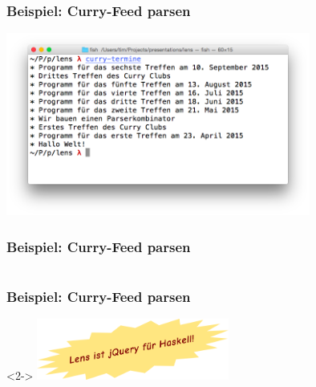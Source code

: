 \documentclass{beamer}
\begin{document}
\begin{frame}
  \frametitle{Beispiel: Curry-Feed parsen}
  \begin{center}
    \includegraphics[width=10cm]{curry-termine-screenshot.png}
  \end{center}
\end{frame}

\begin{frame}
  \frametitle{Beispiel: Curry-Feed parsen}
  \inputminted[fontsize=\footnotesize]{xml}{curry-feed.xml}
\end{frame}

{
\begin{frame}[b]
  \frametitle{Beispiel: Curry-Feed parsen}
  \begin{visibleenv}<2->
    \hfill \includegraphics[height=2cm]{lens-jquery.png}
  \end{visibleenv}
  \vspace{-2cm}
  \inputminted[fontsize=\small]{haskell}{curry-termine/Main.hs}
\end{frame}}
\end{document}
